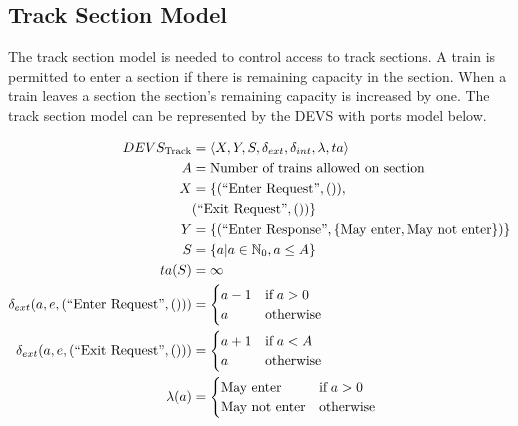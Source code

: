 \subsection{Track Section Model}

The track section model is needed to control access to track sections. A train
is permitted to enter a section if there is remaining capacity in the section.
When a train leaves a section the section's remaining capacity is increased by
one. The track section model can be represented by the DEVS with ports model 
below.

\newcommand{\InEnterReq}[0]{(\text{``Enter Request''}, ())}
\newcommand{\InExitReq}[0]{(\text{``Exit Request''}, ())}

\newcommand{\OutEnterRes}[1]{(\text{``Enter Response''}, #1)}

\begin{align*}
DEVS_{\textrm{Track}} &= \left<X,Y,S,\delta_{ext},\delta_{int},\lambda,ta\right> \\
    A &= \text{Number of trains allowed on section} \\
    X &= \{\InEnterReq, \\
        & \InExitReq
    \} \\
    Y &= \{\OutEnterRes{\{\text{May enter}, \text{May not enter}\}}\} \\
    S &= \{ a | a \in \mathbb{N}_0, a \leq A \} \\
    ta(S) &= \infty \\
    \delta_{ext}(a, e, \InEnterReq) &= 
        \begin{cases}
            a - 1 & \text{if\;} a > 0 \\
            a & \text{otherwise} \\
        \end{cases} \\
    \delta_{ext}(a, e, \InExitReq) &= 
        \begin{cases}
            a + 1 & \text{if\;} a < A \\
            a & \text{otherwise} \\
        \end{cases} \\
    \lambda(a) &= 
        \begin{cases}
            \text{May enter} & \text{if\;} a > 0 \\
            \text{May not enter} & \text{otherwise} \\
        \end{cases}
\end{align*}

